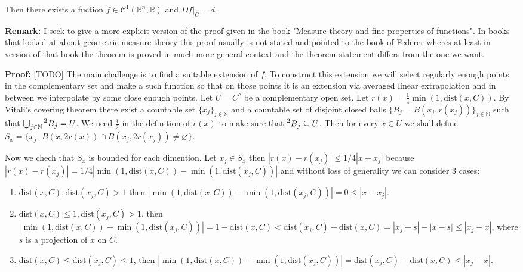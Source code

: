 \documentclass{article}
\begin{document}
Then there exists a fuction $\overline f\in\mathcal{C}^1(\mathbb{R}^n,\mathbb{R})$
and $D\overline f|_C=d$.

\vspace{1ex}
\textbf{Remark:}
I seek to give a more explicit version of the proof given in the book "Measure
theory and fine properties of functions". In books that looked at about
geometric measure theory this proof usually is not stated and pointed to the
book of Federer wheres at least in version of that book the theorem is proved
in much more general context and the theorem statement differs from the one we
want.

\vspace{1ex}
\textbf{Proof:} [TODO]
The main challenge is to find a suitable extension of $f$. To construct this
extension we will select regularly enough points in the complementary set and
make a such function so that on those points it is an extension via averaged linear extrapolation and in
between we interpolate by some close enough points. Let $U=C^c$ be a complementary
open set. Let $r(x)=\frac{1}{4}\min(1,\text{dist}(x,C))$.
By Vitali's covering theorem there exist a countable set
$\{x_j\}_{j\in\mathbb{N}}$ and a countable set of disjoint closed balls $\{B_j=B(x_j, r(x_j))\}_
{j\in\mathbb{N}}$ such that $\bigcup_{j\in\mathbb{N}}\prescript{2}{}B_j=U$. We
need $\frac{1}{2}$ in the definition of $r(x)$ to make sure that $\prescript{2}{}
B_j\subseteq U$. Then for every $x\in U$ we shall define $S_x=\{x_j\,|\,B(x,2r(x))
\cap B(x_j,2r(x_j))\neq\varnothing\}$. 

\vspace{1ex}
Now we chech that $S_x$ is bounded for each dimention.
Let $x_j\in S_x$ then $|r(x)-r(x_j)| \leq 1/4|x-x_j|$ because $|r(x)-r(x_j)|=
1/4|\min(1,\text{dist}(x,C))-\min(1,\text{dist}(x_j,C))|$ and without loss of
generality we can consider 3 cases:
\begin{enumerate}
    \item $\text{dist}(x,C),\text{dist}(x_j,C)>1$ then $|\min(1,\text{dist}(x,C))
        -\min(1,\text{dist}(x_j,C))|=0\leq|x-x_j|$.
    \item $\text{dist}(x,C)\leq1,\text{dist}(x_j,C)>1$, then $|\min(1,\text{dist}
        (x,C))-\min(1,\text{dist}(x_j,C))| = 1-\text{dist}(x,C)<\text{dist}(x_j,C)
        -\text{dist}(x,C)=|x_j-s|-|x-s|\leq|x_j-x|$, where $s$ is a projection
        of $x$ on $C$. 
    \item $\text{dist}(x,C)\leq\text{dist}(x_j,C)\leq1$, then $|\min(1,\text{dist}
        (x,C))-\min(1,\text{dist}(x_j,C))| = \text{dist}(x_j,C)-\text{dist}(x,C)
        \leq|x_j-x|$.
\end{enumerate}
\end{document}
